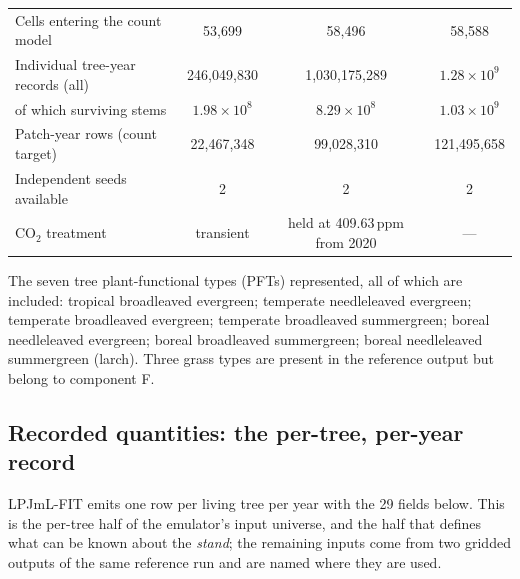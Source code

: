 \documentclass[11pt]{article}
\begin{document}
\begin{table}[h]
{\begin{tabular}{lccc}
Cells entering the count model & 53{,}699 & 58{,}496 & 58{,}588 \\
Individual tree-year records (all) & 246{,}049{,}830 & 1{,}030{,}175{,}289 & $1.28 \times 10^{9}$ \\
\quad of which surviving stems & $1.98 \times 10^{8}$ & $8.29 \times 10^{8}$ & $1.03 \times 10^{9}$ \\
Patch-year rows (count target) & 22{,}467{,}348 & 99{,}028{,}310 & 121{,}495{,}658 \\
Independent seeds available & 2 & 2 & 2 \\
CO$_2$ treatment & transient & held at 409.63\,ppm from 2020 & --- \\
\bottomrule
\end{tabular}%
}
\end{table}

The seven tree plant-functional types (PFTs) represented, all of which are included: tropical broadleaved evergreen; temperate needleleaved evergreen; temperate broadleaved evergreen; temperate broadleaved summergreen; boreal needleleaved evergreen; boreal broadleaved summergreen; boreal needleleaved summergreen (larch). Three grass types are present in the reference output but belong to component F.

\subsection{Recorded quantities: the per-tree, per-year record}
\label{sec:recorded}

LPJmL-FIT emits one row per living tree per year with the 29 fields below. This is the per-tree half of the emulator's input universe, and the half that defines what can be known about the \emph{stand}; the remaining inputs come from two gridded outputs of the same reference run and are named where they are used.
\end{document}
